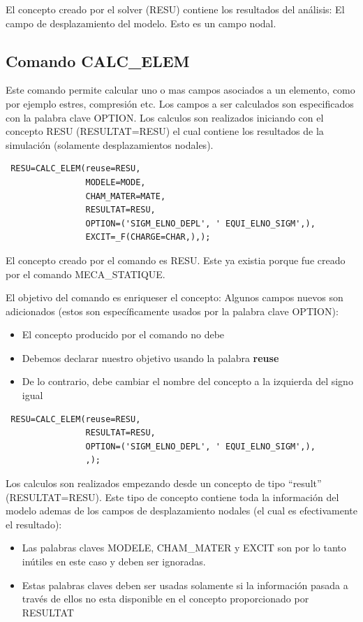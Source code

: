 \documentclass[12pt]{book}
\theoremstyle{definition}
\theoremstyle{remark}
\theoremstyle{plain}
\begin{document}
El concepto creado por el solver (RESU) contiene los resultados del análisis: El
campo de desplazamiento del modelo. Esto es un campo nodal.

\subsection{Comando CALC\_ELEM}

Este comando permite calcular uno o mas campos asociados a un elemento, como por 
ejemplo estres, compresión etc. Los campos a ser calculados son especificados 
con la palabra clave OPTION. Los calculos son realizados iniciando con el concepto
RESU (RESULTAT=RESU) el cual contiene los resultados de la simulación (solamente 
desplazamientos nodales).
\begin{verbatim}
 RESU=CALC_ELEM(reuse=RESU,
                MODELE=MODE,
                CHAM_MATER=MATE,
                RESULTAT=RESU,
                OPTION=('SIGM_ELNO_DEPL', ' EQUI_ELNO_SIGM',),
                EXCIT=_F(CHARGE=CHAR,),);
\end{verbatim} 
El concepto creado por el comando es RESU. Este ya existia porque fue creado por el
comando MECA\_STATIQUE.

El objetivo del comando es enriqueser el concepto: Algunos campos nuevos son 
adicionados (estos son específicamente usados por la palabra clave OPTION):
\begin{itemize}
 \item El concepto producido por el comando no debe 
 \item Debemos declarar nuestro objetivo usando la palabra \textbf{reuse}
 \item De lo contrario, debe cambiar el nombre del concepto a la izquierda del
signo igual
\end{itemize}

\begin{verbatim}
 RESU=CALC_ELEM(reuse=RESU,
                RESULTAT=RESU,
                OPTION=('SIGM_ELNO_DEPL', ' EQUI_ELNO_SIGM',),
                ,);
\end{verbatim} 

Los calculos son realizados empezando desde un concepto de tipo ``result'' (RESULTAT=RESU).
Este tipo de concepto contiene toda la información del modelo ademas de los
campos de desplazamiento nodales (el cual es efectivamente el resultado):

\begin{itemize}
 \item Las palabras claves MODELE, CHAM\_MATER y EXCIT son por lo tanto inútiles
en este caso y deben ser ignoradas.
 \item Estas palabras claves deben ser usadas solamente si la información pasada
a través de ellos no esta disponible en el concepto proporcionado por RESULTAT
\end{itemize}
\end{document}
